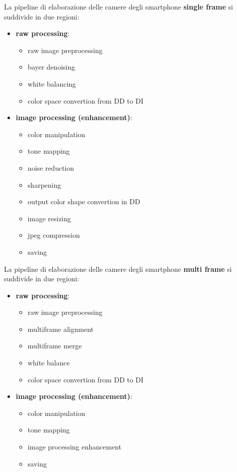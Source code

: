 La pipeline di elaborazione delle camere degli smartphone \textbf{single frame} si 
suddivide in due regioni:
\begin{itemize}
    \item \textbf{raw processing}: 
    \begin{itemize}
        \item raw image preprocessing
        \item bayer denoising
        \item white balancing
        \item color space convertion from DD to DI
    \end{itemize}
    \item \textbf{image processing (enhancement)}: 
    \begin{itemize}
        \item color manipulation
        \item tone mapping
        \item noise reduction
        \item sharpening
        \item output color shape convertion in DD
        \item image resizing
        \item jpeg compression
        \item saving
    \end{itemize}
\end{itemize}

La pipeline di elaborazione delle camere degli smartphone \textbf{multi frame} si 
suddivide in due regioni:
\begin{itemize}
    \item \textbf{raw processing}: 
    \begin{itemize}
        \item raw image preprocessing
        \item multiframe alignment
        \item multiframe merge
        \item white balance
        \item color space convertion from DD to DI
    \end{itemize}
    \item \textbf{image processing (enhancement)}: 
    \begin{itemize}
        \item color manipulation
        \item tone mapping
        \item image processing enhancement
        \item saving
    \end{itemize}
\end{itemize}

